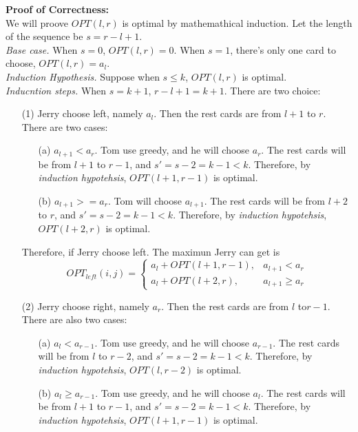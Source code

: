 \documentclass[10.5pt]{article}
\newenvironment{main idea}{\textbf{Main Idea: }}{}
\newenvironment{prcor}{\textbf{Proof of Correctness: }\\}{}
\theoremstyle{remark}
\begin{document}
\begin{prcor}
	We will proove \(OPT(l, r)\) is optimal by mathemathical induction. Let the length of the sequence be \(s = r - l + 1\).\\
	\textit{Base case.} When \(s = 0\), \(OPT(l, r) = 0\). When \(s = 1\), there's only one card to choose, \(OPT(l, r) = a_l\).\\
	\textit{Induction Hypothesis.} Suppose when \(s \le k\), \(OPT(l,r)\) is optimal.\\
	\textit{Inducntion steps.} When \(s = k + 1\), \(r - l + 1 = k + 1\). There are two choice:\\
	\begin{enumerate}
		\item[(1)]Jerry choose left, namely \(a_l\). Then the rest cards are from \(l + 1\) to \(r\). There are two cases:
		      \begin{enumerate}
			      \item[(a)]\(a_{l + 1} < a_r\). Tom use greedy, and he will choose \(a_r\). The rest cards will be from \(l + 1\) to \(r - 1\), and \(s' = s - 2 = k - 1 < k\). Therefore, by \textit{induction hypotehsis}, \(OPT(l + 1, r - 1)\) is optimal.
			      \item[(b)] \(a_{l + 1} >= a_r\). Tom will choose \(a_{l + 1}\). The rest cards will be from \(l + 2\) to \(r\), and \(s' = s - 2 = k - 1 < k\). Therefore, by \textit{induction hypotehsis}, \(OPT(l + 2, r)\) is optimal.
		      \end{enumerate}
		      Therefore, if Jerry choose left. The maximun Jerry can get is
		      \[
			      OPT_{left}(i, j) =
			      \begin{cases}
				      a_l + OPT(l + 1, r - 1), & a_{l + 1} < a_r  \\
				      a_l + OPT(l + 2, r),     & a_{l + 1}\ge a_r
			      \end{cases}
		      \]
		\item[(2)]Jerry choose right, namely \(a_r\). Then the rest cards are from \(l\) to\(r - 1\). There are also two cases:
		      \begin{enumerate}
			      \item[(a)]\(a_l < a_{r - 1}\). Tom use greedy, and he will choose \(a_{r - 1}\). The rest cards will be from \(l\) to \(r - 2\), and \(s' = s - 2 = k - 1 < k\). Therefore, by \textit{induction hypotehsis}, \(OPT(l, r - 2)\) is optimal.
			      \item[(b)]\(a_l \ge a_{r - 1}\). Tom use greedy, and he will choose \(a_l\). The rest cards will be from \(l + 1\) to \(r - 1\), and \(s' = s - 2 = k - 1 < k\). Therefore, by \textit{induction hypotehsis}, \(OPT(l + 1, r - 1)\) is optimal.

\end{enumerate}
\end{enumerate}
\end{prcor}
\end{document}
